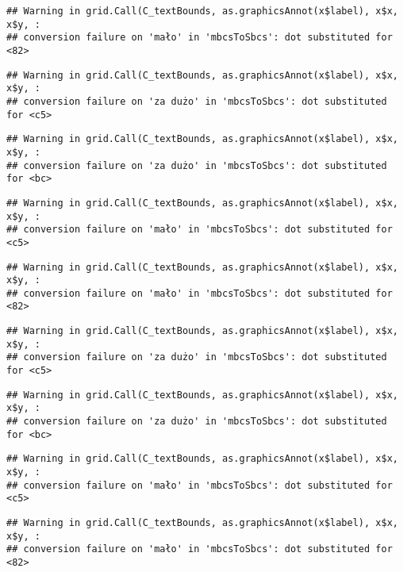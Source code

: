 \documentclass[
]{book}
\begin{document}
\begin{verbatim}
## Warning in grid.Call(C_textBounds, as.graphicsAnnot(x$label), x$x, x$y, :
## conversion failure on 'mało' in 'mbcsToSbcs': dot substituted for <82>
\end{verbatim}

\begin{verbatim}
## Warning in grid.Call(C_textBounds, as.graphicsAnnot(x$label), x$x, x$y, :
## conversion failure on 'za dużo' in 'mbcsToSbcs': dot substituted for <c5>
\end{verbatim}

\begin{verbatim}
## Warning in grid.Call(C_textBounds, as.graphicsAnnot(x$label), x$x, x$y, :
## conversion failure on 'za dużo' in 'mbcsToSbcs': dot substituted for <bc>
\end{verbatim}

\begin{verbatim}
## Warning in grid.Call(C_textBounds, as.graphicsAnnot(x$label), x$x, x$y, :
## conversion failure on 'mało' in 'mbcsToSbcs': dot substituted for <c5>
\end{verbatim}

\begin{verbatim}
## Warning in grid.Call(C_textBounds, as.graphicsAnnot(x$label), x$x, x$y, :
## conversion failure on 'mało' in 'mbcsToSbcs': dot substituted for <82>
\end{verbatim}

\begin{verbatim}
## Warning in grid.Call(C_textBounds, as.graphicsAnnot(x$label), x$x, x$y, :
## conversion failure on 'za dużo' in 'mbcsToSbcs': dot substituted for <c5>
\end{verbatim}

\begin{verbatim}
## Warning in grid.Call(C_textBounds, as.graphicsAnnot(x$label), x$x, x$y, :
## conversion failure on 'za dużo' in 'mbcsToSbcs': dot substituted for <bc>
\end{verbatim}

\begin{verbatim}
## Warning in grid.Call(C_textBounds, as.graphicsAnnot(x$label), x$x, x$y, :
## conversion failure on 'mało' in 'mbcsToSbcs': dot substituted for <c5>
\end{verbatim}

\begin{verbatim}
## Warning in grid.Call(C_textBounds, as.graphicsAnnot(x$label), x$x, x$y, :
## conversion failure on 'mało' in 'mbcsToSbcs': dot substituted for <82>
\end{verbatim}
\end{document}
